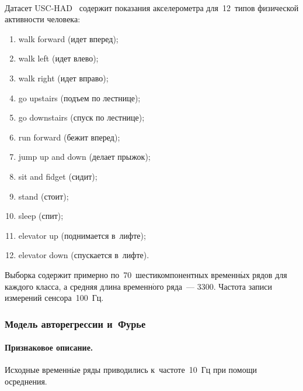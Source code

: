\begin{multicols}{2}
\begin{figure*}[b] %
\vspace*{6pt}
\begin{center}
\mbox{%
\epsfxsize=128.626mm
}
\end{center}
\vspace*{-9pt}
\label{fig:USCHAD_AR_FOURIER}
\end{figure*}


Датасет USC-HAD~\cite{mi12:ubicomp-sagaware} содержит показания акселерометра 
для~12~типов физической активности человека:
\begin{enumerate}[1)]
  \item walk forward (идет вперед);
  \item walk left (идет влево);
  \item walk right (идет вправо);
  \item go upstairs (подъем по лестнице);
  \item go downstairs (спуск по лестнице);
  \item run forward (бежит вперед);
  \item jump up and down (делает прыжок);
  \item sit and fidget (сидит);
  \item stand (стоит);
  
  \pagebreak
  
  
  \item sleep (спит);
  \item elevator up (поднимается в~лифте);
  \item elevator down (спускается в~лифте).
\end{enumerate}

Выборка содержит примерно по~70~шестикомпонентных временн$\acute{\mbox{ы}}$х 
рядов для каждого класса, а средняя длина временн$\acute{\mbox{о}}$го ряда~--- 3300. 
Частота записи измерений сенсора~100~Гц.

\vspace*{-6pt}


\subsubsection{Модель авторегрессии %
и~Фурье} %

\vspace*{-2pt}

\paragraph*{Признаковое описание.}
Исходные временн$\acute{\mbox{ы}}$е ряды приводились к~частоте~10~Гц 
при помощи осреднения.


\end{multicols}
